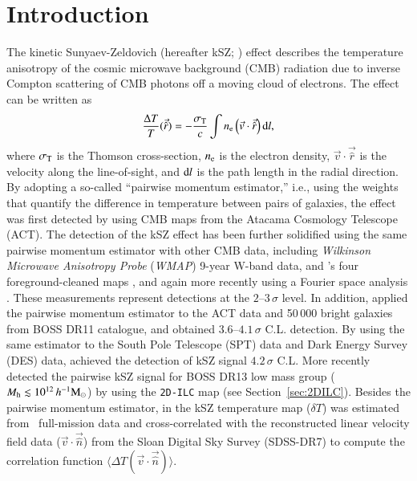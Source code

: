 \documentclass[traditabstract, longauth]{aa}
\newcommand{\1}{\'\i }
\def \der {{\rm d}}
\begin{document}
\section{Introduction}
\label{sec:intro}

The kinetic Sunyaev-Zeldovich (hereafter kSZ; \citealt{kSZ0,kSZ}) effect
describes the temperature anisotropy of the cosmic microwave background (CMB)
radiation due to inverse Compton scattering of CMB photons off a moving cloud
of electrons.  The effect can be written as
\begin{eqnarray}
  \frac{\Delta T}{T}(\vec{\hat{r}})=-\frac{\sigma_{\rm T}}{c} \int n_{\rm e}
  \left(\vec{v}\cdot \vec{\hat{r}} \right) \der l ,\label{eq:kSZ1}
\end{eqnarray}
where $\sigma_{\rm T}$ is the Thomson cross-section, $n_{\rm e}$ is the
electron density, $\vec{v}\cdot \vec{\hat{r}}$ is the velocity along the
line-of-sight, and $\der l$ is the path length in the radial direction. By
adopting a so-called ``pairwise momentum estimator,'' i.e., using the weights
that quantify the difference in temperature between pairs of galaxies, the
effect was first detected by \cite{Handetal2012} using CMB maps from the
Atacama Cosmology Telescope (ACT). The detection of the kSZ effect has been
further solidified using the same pairwise momentum estimator with other CMB
data, including {\it Wilkinson Microwave Anisotropy Probe} ({\it WMAP}) 9-year W-band data, and \Planck's four foreground-cleaned
maps \citep{planck2015-XXXVII}, and again more recently using a Fourier space
analysis \citep{Sugiyama2017}. These measurements represent detections
at the $2$--$3\,\sigma$
level. In addition, \citet{Bernardis17} applied the pairwise momentum estimator to the ACT data and 50\,000 bright galaxies from BOSS DR11 catalogue, and obtained $3.6$--$4.1\,\sigma$ C.L. detection. By using the same estimator to the South Pole Telescope (SPT) data and Dark Energy Survey (DES) data, \citet{Soergel16} achieved the detection of kSZ signal $4.2\,\sigma$ C.L. More recently \citet{LiMa17} detected the pairwise kSZ signal for BOSS DR13 low mass group ($M_{\rm h} \lesssim 10^{12}\,h^{-1}{\rm M}_{\odot}$) by using the {\tt 2D-ILC} map (see Section~\ref{sec:2DILC}). Besides the pairwise momentum estimator, in \citet{planck2015-XXXVII} the kSZ temperature map
($\delta T$) was estimated from \Planck\ full-mission data and cross-correlated
with the reconstructed linear velocity field data ($\vec{v}\cdot
\vec{\hat{n}}$) from the Sloan Digital Sky Survey (SDSS-DR7)
to compute the correlation function
$\langle \Delta T (\vec{v}\cdot \vec{\hat{n}}) \rangle$.
\end{document}
